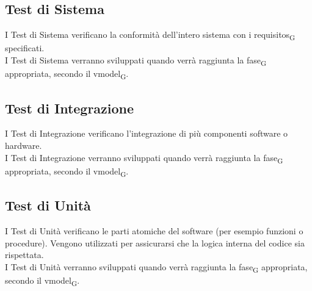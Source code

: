 
\subsection{Test di Sistema}
I Test di Sistema verificano la conformità dell'intero sistema con i \glspl{requisito}\textsubscript{G} specificati.\\I Test di Sistema verranno sviluppati quando verrà raggiunta la \gls{fase}\textsubscript{G} appropriata, secondo il \gls{vmodel}\textsubscript{G}.

\subsection{Test di Integrazione}
I Test di Integrazione verificano l'integrazione di più componenti software o hardware.\\I Test di Integrazione verranno sviluppati quando verrà raggiunta la \gls{fase}\textsubscript{G} appropriata, secondo il \gls{vmodel}\textsubscript{G}.

\subsection{Test di Unità}
I Test di Unità verificano le parti atomiche del software (per esempio funzioni o procedure). Vengono utilizzati per assicurarsi che la logica interna del codice sia rispettata.\\I Test di Unità verranno sviluppati quando verrà raggiunta la \gls{fase}\textsubscript{G} appropriata, secondo il \gls{vmodel}\textsubscript{G}.
